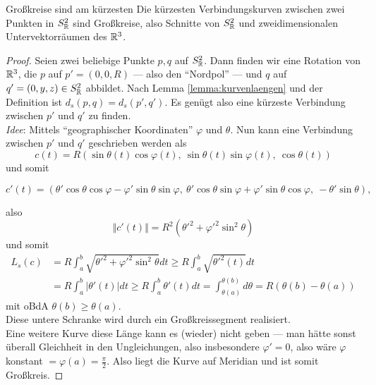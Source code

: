 \begin{lemma}{Großkreise sind am kürzesten}
  Die kürzesten Verbindungskurven zwischen zwei Punkten in $ S^2_{\mathbb{R}} $ sind Großkreise, also Schnitte von $ S^2_{\mathbb{R}} $ und zweidimensionalen Untervektorräumen des $ \mathbb{R}^3 $.
  \begin{proof}
    Seien zwei beliebige Punkte $ p,q $ auf $ S^2_{\mathbb{R}} $. Dann finden wir eine Rotation von $ \mathbb{R}^3 $, die $ p $ auf $ p' = (0,0,R) $ --- also den ``Nordpol'' --- und $ q $ auf $ q' = (0,y,z) \in S^2_{\mathbb{R}} $ abbildet. Nach Lemma \autoref{lemma:kurvenlaengen} und der Definition ist $ d_s(p,q) = d_s(p', q') $. Es genügt also eine kürzeste Verbindung zwischen $ p' $ und $ q' $ zu finden. \\
    \emph{Idee}: Mittels ``geographischer Koordinaten'' $ \varphi $ und $ \theta $. Nun kann eine Verbindung zwischen $ p' $ und $ q' $ geschrieben werden als
    \begin{equation*}
      c(t) = R(\sin\theta(t)\cos\varphi(t), \ \sin\theta(t)\sin\varphi(t), \ \cos\theta(t))
    \end{equation*}
    und somit
    \begin{small}
      \begin{equation*}
        c'(t) = (\theta'\cos\theta\cos\varphi-\varphi'\sin\theta\sin\varphi, \ \theta'\cos\theta\sin\varphi+\varphi'\sin\theta\cos\varphi, \ -\theta'\sin\theta)\text{,}
      \end{equation*}
    \end{small}
    also
    \begin{equation*}
      \Vert c'(t) \Vert = R^2({\theta'}^2 + {\varphi'}^2\sin^2\theta)
    \end{equation*}
    und somit
    \begin{align*}
      L_s(c) &= R\int_a^b\sqrt{{\theta'}^2+{\varphi'}^2\sin^2\theta}dt \geq R\int_a^b\sqrt{{\theta'}^2(t)}dt \\
      &= R\int_a^b \vert \theta'(t) \vert dt \geq R\int_a^b \theta'(t)dt = \int_{\theta(a)}^{\theta(b)}d\theta = R(\theta(b)-\theta(a))
    \end{align*}
    mit oBdA $ \theta(b) \geq \theta(a) $. \\
    Diese untere Schranke wird durch ein Großkreissegment realisiert. \\
    Eine weitere Kurve diese Länge kann es (wieder) nicht geben --- man hätte sonst überall Gleichheit in den Ungleichungen, also insbesondere $ \varphi' = 0 $, also wäre $ \varphi $ konstant $ = \varphi(a) = \frac{\pi}{2} $. Also liegt die Kurve auf Meridian und ist somit Großkreis.
  \end{proof}
\end{lemma}

